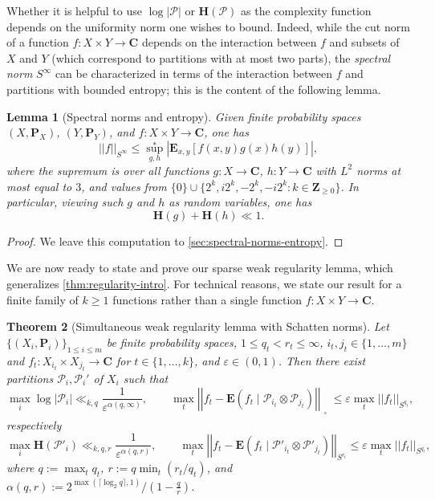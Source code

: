 \documentclass[reqno,11pt]{amsart}
\newtheorem{theorem}{Theorem}[section]
\newtheorem{lemma}[theorem]{Lemma}
\theoremstyle{definition}
\theoremstyle{remark}
\numberwithin{equation}{section}
\newcommand{\Z}{\mathbf{Z}}
\newcommand{\C}{\mathbf{C}}
\renewcommand{\P}{\mathbf{P}}
\renewcommand{\H}{\mathbf{H}}
\newcommand{\E}{\mathbf{E}}
\newcommand{\mP}{\mathcal{P}}
\newcommand{\eps}{\varepsilon}
\newcommand{\sq}{_{\substack{ \\ \square}}}
\begin{document}
Whether it is helpful to use $\log |\mP|$ or $\H(\mP)$ as the complexity function depends on the uniformity norm one wishes to bound. Indeed, while the cut norm of a function $f : X \times Y \to \C$ depends on the interaction between $f$ and subsets of $X$ and $Y$ (which correspond to partitions with at most two parts), the \emph{spectral norm} $S^\infty$ can be characterized in terms of the interaction between $f$ and partitions with bounded entropy; this is the content of the following lemma.

\begin{lemma}[Spectral norms and entropy] \label{lem:modify-spectral}
Given finite probability spaces $(X, \P_X)$, $(Y, \P_Y)$, and $f : X \times Y \to \C$, one has
\[
    ||f||_{S^\infty} \le \sup_{g,h}^* \left\vert \E_{x,y}[f(x,y)g(x)h(y)]\right\vert,
\]
where the supremum is over all functions $g : X \to \C$, $h : Y \to \C$ with $L^2$ norms at most equal to $3$, and values from $\{0\} \cup \{2^k, i2^k, -2^k, -i2^k : k \in \Z_{\ge 0}\}$. In particular, viewing such $g$ and $h$ as random variables, one has
\[
    \H(g) + \H(h) \ll 1.
\]
\end{lemma}

\begin{proof}
We leave this computation to \cref{sec:spectral-norms-entropy}.
\end{proof}




We are now ready to state and prove our sparse weak regularity lemma, which generalizes \cref{thm:regularity-intro}. For technical reasons, we state our result for a finite family of $k \ge 1$ functions rather than a single function $f : X \times Y \to \C$.

\begin{theorem}[Simultaneous weak regularity lemma with Schatten norms] \label{thm:regularity}
Let $\{(X_i, \P_i)\}_{1 \le i \le m}$ be finite probability spaces, $1 \le q_t < r_t \le \infty$, $i_t, j_t \in \{1, \ldots, m\}$ and $f_t : X_{i_t} \times X_{j_t} \to \C$ for $t \in \{1, \ldots, k\}$, and $\eps \in (0, 1)$.
Then there exist partitions $\mP_i, \mP_i'$ of $X_i$ such that
\begin{equation}\label{eq:cut-norm-bound}
    \max_i \log |\mP_i| \ll_{k,q} \frac{1}{\eps^{\alpha(q,\infty)}}, \quad\quad
    \max_t \left\vert \left\vert f_t - \E(f_t \mid \mP_{i_t} \otimes \mP_{j_t})
    \right\vert\right\vert\sq \le \eps \max_t ||f_t||_{S^{q_t}},
\end{equation}
respectively
\begin{equation}\label{eq:spec-norm-bound}
    \max_i \H(\mP'_i) \ll_{k,q,r} \frac{1}{\eps^{\alpha(q,r)}},
    \quad\quad
    \max_t \left\vert \left\vert f_t - \E(f_t \mid \mP'_{i_t} \otimes \mP'_{j_t})
    \right\vert\right\vert_{S^{r_t}} \le \eps \max_t ||f_t||_{S^{q_t}},
\end{equation}
where $q := \max_t q_t$, $r := q \min_{t} (r_t/q_t)$, and $\alpha(q,r) := 2^{\max(\lceil \log_2 q \rceil, 1)}/(1 - \frac{q}{r})$.
\end{theorem}
\end{document}
